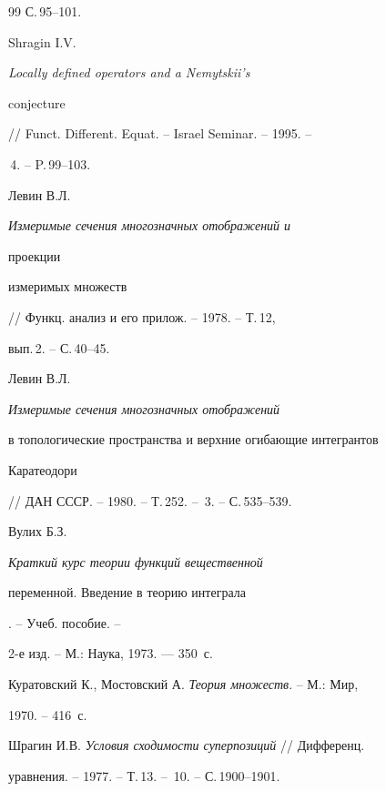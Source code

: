 \begin{thebibliography}{99}
С.\,95--101.







Shragin I.V. {\em Locally defined operators and a Nemytskii's


conjecture} // Funct. Different. Equat. -- Israel Seminar. -- 1995. --


\No\,4. -- P.\,99--103.







Левин В.Л. {\em Измеримые сечения многозначных отображений и


проекции


измеримых множеств} // Функц. анализ и его прилож. -- 1978. -- Т.\,12,


вып.\,2. -- С.\,40--45.







Левин В.Л. {\em Измеримые сечения многозначных отображений


в топологические пространства и верхние огибающие интегрантов


Каратеодори} // ДАН СССР. -- 1980. -- Т.\,252. -- \No\,3. -- С.\,535--539.







Вулих Б.З. {\em Краткий курс теории функций вещественной


переменной. Введение в теорию интеграла}. -- Учеб. пособие. --


2-е изд. -- М.: Наука, 1973. --- 350~с.







Куратовский К., Мостовский А. {\em Теория множеств}. -- М.: Мир,


1970. -- 416~с.







Шрагин И.В. {\em Условия сходимости суперпозиций} // Дифференц.


уравнения. -- 1977. -- Т.\,13. -- \No\,10. -- С.\,1900--1901.








\end{thebibliography}
